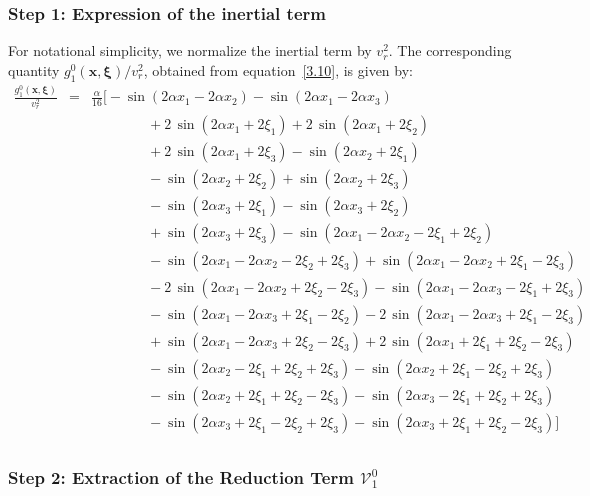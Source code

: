\documentclass[11pt]{jfm}
\numberwithin{equation}{section}
\begin{document}
\subsubsection{Step 1: Expression of the inertial term}
For notational simplicity, we normalize the inertial term by $v_r^2$. The corresponding quantity $g_1^0(\boldsymbol{x}, \boldsymbol{\xi})/v_r^2$, obtained from equation~\eqref{3.10}, is given by:
\begin{eqnarray}
\label{4.2}
\frac{g_1^0(\boldsymbol{x}, \boldsymbol{\xi})}{v_r^2} &=& \frac{\alpha}{16}\Big[-\sin(2\alpha x_1-2\alpha x_2) -\sin(2\alpha x_1-2\alpha x_3)
\nonumber\\ && \qquad\qquad +2\,\sin(2\alpha x_1+2\xi_1) +2\,\sin(2\alpha x_1+2\xi_2)
\nonumber\\ && \qquad\qquad +2\,\sin(2\alpha x_1+2\xi_3) -\sin(2\alpha x_2+2\xi_1)
\nonumber\\ && \qquad\qquad -\sin(2\alpha x_2+2\xi_2) +\sin(2\alpha x_2+2\xi_3)
\nonumber\\ && \qquad\qquad -\sin(2\alpha x_3+2\xi_1) -\sin(2\alpha x_3+2\xi_2)
\nonumber\\ && \qquad\qquad +\sin(2\alpha x_3+2\xi_3) -\sin(2\alpha x_1-2\alpha x_2-2\xi_1+2\xi_2)
\nonumber\\ && \qquad\qquad -\sin(2\alpha x_1-2\alpha x_2-2\xi_2+2\xi_3) +\sin(2\alpha x_1-2\alpha x_2+2\xi_1-2\xi_3)
\nonumber\\ && \qquad\qquad -2\,\sin(2\alpha x_1-2\alpha x_2+2\xi_2-2\xi_3) -\sin(2\alpha x_1-2\alpha x_3-2\xi_1+2\xi_3)
\nonumber\\ && \qquad\qquad -\sin(2\alpha x_1-2\alpha x_3+2\xi_1-2\xi_2) -2\,\sin(2\alpha x_1-2\alpha x_3+2\xi_1-2\xi_3)
\nonumber\\ && \qquad\qquad +\sin(2\alpha x_1-2\alpha x_3+2\xi_2-2\xi_3) +2\,\sin(2\alpha x_1+2\xi_1+2\xi_2-2\xi_3)
\nonumber\\ && \qquad\qquad -\sin(2\alpha x_2-2\xi_1+2\xi_2+2\xi_3) -\sin(2\alpha x_2+2\xi_1-2\xi_2+2\xi_3)
\nonumber\\ && \qquad\qquad -\sin(2\alpha x_2+2\xi_1+2\xi_2-2\xi_3) -\sin(2\alpha x_3-2\xi_1+2\xi_2+2\xi_3)
\nonumber\\ && \qquad\qquad -\sin(2\alpha x_3+2\xi_1-2\xi_2+2\xi_3) -\sin(2\alpha x_3+2\xi_1+2\xi_2-2\xi_3)\Big]\nonumber\\
\end{eqnarray}
\subsubsection{Step 2: Extraction of the Reduction Term $\mathcal{V}_1^0$}
\end{document}

